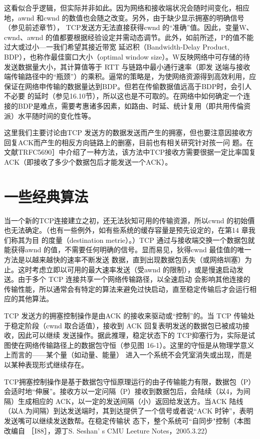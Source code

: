 这看似合乎逻辑，但实际并非如此。因为网络和接收端状况会随时间变化，相应地，awnd 和cwnd 的数值也会随之改变。另外，由于缺少显示拥塞的明确信号（参见前述章节），
TCP发送方无法直接获得cwnd 的“准确”值。因此，变量W、cwnd、awnd 的值都要根据经验设定并需动态调节。此外，如前所述，P的值不能过大或过小—一我们希望其接近带宽
延迟积（Bandwidth-Delay Product, BDP），也称作最佳窗口大小（optimal window size）。W反映网络中可存储的待发送数据量大小，其计算值等于 RTT 与链路中最小通行速率（即发
送端与接收端传输路径中的“瓶颈”）的乘积。逼常的策略是，为使网络资源得到高效利用，应保证在网络申传输的数据量达到BDP。但若在传偷数据值远高于BDP时，会引人不必要
的延时（参见16.10节），所以这也是不可取的。在网络中如何确定一个连接的BDP是难点，需要考惠诸多因素，如路由、时延、统计复用（即共用传倫资派）水平随时间的变化性等。

\begin{tcolorbox}
    这里我们主要讨论由TCP 发送方的数据发送而产生的拥塞，但也要注意因接收方回复ACK而产生的相反方向链路上的删塞，目前也有相关研究针对孩一问
    题。在文献TRFC5690］中介绍了一种方法，该方法中TCP接收方需要很据一定比率国复ACK（即接收了多少个数据包后才能发送一个ACK）。
\end{tcolorbox}

\section{一些经典算法}
当一个新的TCP连接建立之初，还无法狄知可用的传输资源，所以cwnd 的初始價也无法确定。（也有一些例外，如有些系统的缓存容量是预先设定的，在第14 章我们称其为目
的度量（destination metrie）。）TCP 通过与接收端交换一个数据包就能获得awnd 的值，不需要任何明确的信号。显而易见，狄得cwnd 最佳值的唯一方法是以越来越快的速率不断发送
数据，直到出现数据包丢失（或网络圳塞）为止。这时考虑立即以可用的最大速率发送（受awnd 的限制），或是慢速启动发送。由于多个 TCP 连接共享一个网络传输路径，以全速启动
会影响其他连接的传输性能，所以通常会有特定的算法来避免过快启动，直至稳定传输后才会运行相应的其他算法。

TCP 发送方的拥塞控制操作是由ACK 的接收来驱动或“控制”的。当 TCP 传输处于稳定阶段（cwnd 取合适值），接收到 ACK 回复表明发送的数据包已被成功接收，因此可以继续
发送操作。据此推理，稳定状态下的 TCP抑塞行为，实际是试图使在网络传输路径上的数据包守恒（参见图 16-1）。这里的守恒是从物理学意义上而言的——某个量（如动量、能量）
进入一个系统不会凭室消失或出现，而是以某种表现形式继续存在。

TCP拥塞控制操作是基于数据包守恒原理运行的由子传输能力有限，数据包（P）会适时地“伸展”。接收方以一定问隔（P）接收到数据包后，会陆续（以4，为间隔）生成相应的
ACK，以一定的发送间隔（小）返回给发送方。当ACK 陆线（以A.为间隔）到达发送端时，其到达提供了一个信号或者说“ACK 时钟”，表明发送嘴可以继续发送数帮。在稳定传输状
态下，整个系统可“自同步"控制（本图改编自 ［I88］，源丁S. Seshan' s CMU Leeture Notes，2005.3.22）

